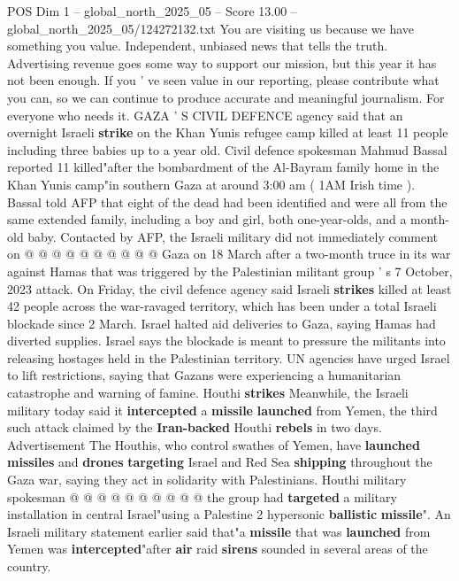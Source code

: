 \begin{textsample}{POS Dim 1 – global\_north\_2025\_05 – Score 13.00 – global\_north\_2025\_05/124272132.txt}  \label{ex:f1_pos_378}
You are visiting us because we have something you value.
Independent, unbiased news that tells the truth.
Advertising revenue goes some way to support our mission, but this year it has not been enough.
If you ' ve seen value in our reporting, please contribute what you can, so we can continue to produce accurate and meaningful journalism.
For everyone who needs it.
GAZA ' S CIVIL DEFENCE agency said that an overnight Israeli \textbf{strike} on the Khan Yunis refugee camp killed at least 11 people including three babies up to a year old.
Civil defence spokesman Mahmud Bassal reported 11 killed"after the bombardment of the Al-Bayram family home in the Khan Yunis camp"in southern Gaza at around 3:00 am ( 1AM Irish time ).
Bassal told AFP that eight of the dead had been identified and were all from the same extended family, including a boy and girl, both one-year-olds, and a month-old baby.
Contacted by AFP, the Israeli military did not immediately comment on @ @ @ @ @ @ @ @ @ @ Gaza on 18 March after a two-month truce in its war against Hamas that was triggered by the Palestinian militant group ' s 7 October, 2023 attack.
On Friday, the civil defence agency said Israeli \textbf{strikes} killed at least 42 people across the war-ravaged territory, which has been under a total Israeli blockade since 2 March.
Israel halted aid deliveries to Gaza, saying Hamas had diverted supplies.
Israel says the blockade is meant to pressure the militants into releasing hostages held in the Palestinian territory.
UN agencies have urged Israel to lift restrictions, saying that Gazans were experiencing a humanitarian catastrophe and warning of famine.
Houthi \textbf{strikes} Meanwhile, the Israeli military today said it \textbf{intercepted} a \textbf{missile} \textbf{launched} from Yemen, the third such attack claimed by the \textbf{Iran-backed} Houthi \textbf{rebels} in two days.
Advertisement The Houthis, who control swathes of Yemen, have \textbf{launched} \textbf{missiles} and \textbf{drones} \textbf{targeting} Israel and Red Sea \textbf{shipping} throughout the Gaza war, saying they act in solidarity with Palestinians.
Houthi military spokesman @ @ @ @ @ @ @ @ @ @ the group had \textbf{targeted} a military installation in central Israel"using a Palestine 2 hypersonic \textbf{ballistic} \textbf{missile}".
An Israeli military statement earlier said that"a \textbf{missile} that was \textbf{launched} from Yemen was \textbf{intercepted}"after \textbf{air} raid \textbf{sirens} sounded in several areas of the country.

\end{textsample}
